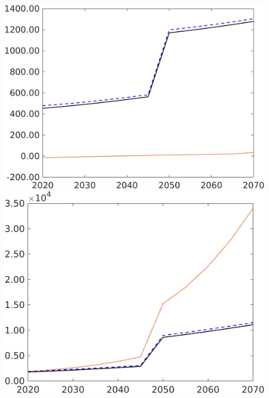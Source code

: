 \begin{figure}[h!!]
\begin{minipage}[]{0.32\textwidth}
	\end{minipage}
	\begin{minipage}[]{0.32\textwidth}
		\includegraphics[width=1\textwidth]{../../codding_model/own_basedOnFried/optimalPol_190722_tidiedUp/figures/all_10Aout22/sgsff_PercentageLfDynNT_Target_regime3_spillover0_noskill0_sep1_xgrowth0_etaa0.79_lgd0.png}
	\end{minipage}
	\begin{minipage}[]{0.32\textwidth}
		\includegraphics[width=1\textwidth]{../../codding_model/own_basedOnFried/optimalPol_190722_tidiedUp/figures/all_10Aout22/LgLf_PercentageLfDynNT_Target_regime3_spillover0_noskill0_sep1_xgrowth0_etaa0.79_lgd0.png}
	\end{minipage}
\end{figure} 
